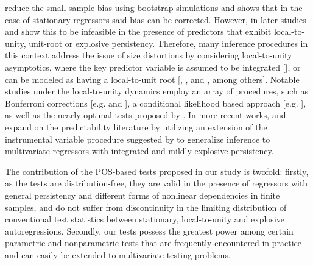 \documentclass[harvard,11pt]{article}
\begin{document}
\citet{nelson1993predictable} reduce the small-sample bias using bootstrap simulations and  \citet{stambaugh1999predictive} shows that in the case of stationary regressors said bias can be corrected. However, in later studies \citet{phillips2013predictive} and \citet{phillips2014confidence} show this to be infeasible in the presence of predictors that exhibit local-to-unity, unit-root or explosive persistency. Therefore, many inference procedures in this context address the issue of size distortions by considering local-to-unity asymptotics, where the key predictor variable is assumed to be integrated
[\citet{lewellen2004predicting}], or can be modeled as having a local-to-unit root [\citet{elliott1994inference}, \citet{torous2004predicting}, and \citet{campbell2006efficient}, among others]. Notable studies under the local-to-unity dynamics employ an array of procedures, such as Bonferroni corrections [e.g. \citet{cavanagh1995inference} and \citet{campbell2006efficient}], a conditional likelihood based approach [e.g. \citet{jansson2006optimal}], as well as the nearly optimal tests proposed by \citet{elliott2015nearly}. In more recent works, \citet{kostakis2015robust} and \citet{phillips2016robust} expand on the predictability literature by utilizing an extension of the instrumental variable procedure suggested by \citet{phillips2009econometric} to generalize inference to multivariate regressors with integrated and mildly explosive persistency. 

The contribution of the POS-based tests proposed in our study is twofold: firstly, as the tests are distribution-free, they are valid in the presence of regressors with general persistency and different forms of nonlinear dependencies in finite samples, and do not suffer from discontinuity in the limiting distribution of conventional test statistics between stationary, local-to-unity and explosive autoregressions. Secondly, our tests possess the greatest power among certain parametric and nonparametric tests that are frequently encountered in practice and can easily be extended to multivariate testing problems. 


\end{document}
